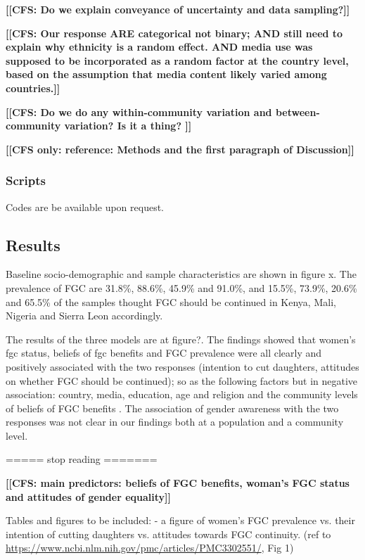 \documentclass[12pt,]{article}
\newcommand{\comment}[1]{\textbf{[[#1]]}}
\newcommand{\cfcmt}[1]{\comment{CFS: #1}}
\newcommand{\cfonly}[1]{\comment{CFS only: #1}}
\begin{document}
\cfcmt{Do we explain conveyance of uncertainty and data sampling?}

\cfcmt{Our response ARE categorical not binary; AND still need to explain why ethnicity is a random effect. AND media use was supposed to be incorporated as a random factor at the country level, based on the assumption that media content likely varied among countries.}

\cfcmt{Do we do any within-community variation and between-community variation?  Is it a thing? }

\cfonly{reference: Methods and the first paragraph of Discussion\cite{Chia14}}


\subsubsection{Scripts}\label{scripts}

Codes are be available upon request. 

\subsection{Results}\label{results-1}


Baseline socio-demographic and sample characteristics are shown in figure x.  The prevalence of FGC are 31.8\%, 88.6\%, 45.9\% and 91.0\%, and 15.5\%, 73.9\%, 20.6\% and 65.5\% of the samples thought FGC should be continued in Kenya, Mali, Nigeria and Sierra Leon accordingly.  

The results of the three models are at figure?.  The findings showed that women’s fgc status, beliefs of fgc benefits and FGC prevalence were all clearly and positively associated with the two responses (intention to cut daughters, attitudes on whether FGC should be continued); so as the following factors but in negative association:  country, media, education, age and religion and the community levels of beliefs of FGC benefits .  The association of gender awareness with the two responses was not clear in our findings both at a population  and a community level.

===== stop reading =======

\cfcmt{main predictors:  beliefs of FGC benefits, woman's FGC status and attitudes of gender equality}

Tables and figures to be included:
- a figure of women’s FGC prevalence vs. their intention of cutting daughters vs. attitudes towards FGC continuity.  (ref to \url{https://www.ncbi.nlm.nih.gov/pmc/articles/PMC3302551/}, Fig 1)
\end{document}
